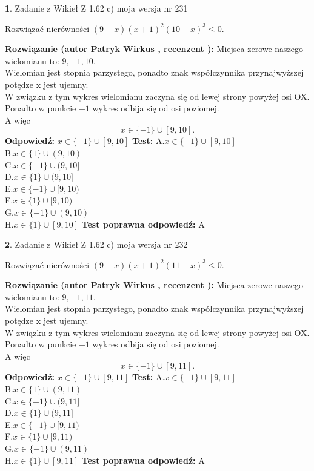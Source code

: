 \documentclass[12pt, a4paper]{article}
\theoremstyle{definition} %
\newtheorem{zad}{}
\newcommand{\zadStart}[1]{\begin{zad}#1\newline}
\newcommand{\zadStop}{\end{zad}}
\newcommand{\rozwStart}[2]{\noindent \textbf{Rozwiązanie (autor #1 , recenzent #2): }\newline}
\newcommand{\rozwStop}{\newline}
\newcommand{\odpStart}{\noindent \textbf{Odpowiedź:}\newline}
\newcommand{\odpStop}{\newline}
\newcommand{\testStart}{\noindent \textbf{Test:}\newline}
\newcommand{\testStop}{\newline}
\newcommand{\kluczStart}{\noindent \textbf{Test poprawna odpowiedź:}\newline}
\newcommand{\kluczStop}{\newline}
\begin{document}
\zadStart{Zadanie z Wikieł Z 1.62 c) moja wersja nr 231}

Rozwiązać nierówności $(9-x)(x+1)^{2}(10-x)^{3}\le0$.
\zadStop
\rozwStart{Patryk Wirkus}{}
Miejsca zerowe naszego wielomianu to: $9, -1, 10$.\\
Wielomian jest stopnia parzystego, ponadto znak współczynnika przy\linebreak najwyższej potędze x jest ujemny.\\ W związku z tym wykres wielomianu zaczyna się od lewej strony powyżej osi OX.\\
Ponadto w punkcie $-1$ wykres odbija się od osi poziomej.\\
A więc $$x \in \{-1\} \cup [9,10].$$
\rozwStop
\odpStart
$x \in \{-1\} \cup [9,10]$
\odpStop
\testStart
A.$x \in \{-1\} \cup [9,10]$\\
B.$x \in \{1\} \cup (9,10)$\\
C.$x \in \{-1\} \cup (9,10]$\\
D.$x \in \{1\} \cup (9,10]$\\
E.$x \in \{-1\} \cup [9,10)$\\
F.$x \in \{1\} \cup [9,10)$\\
G.$x \in \{-1\} \cup (9,10)$\\
H.$x \in \{1\} \cup [9,10]$
\testStop
\kluczStart
A
\kluczStop



\zadStart{Zadanie z Wikieł Z 1.62 c) moja wersja nr 232}

Rozwiązać nierówności $(9-x)(x+1)^{2}(11-x)^{3}\le0$.
\zadStop
\rozwStart{Patryk Wirkus}{}
Miejsca zerowe naszego wielomianu to: $9, -1, 11$.\\
Wielomian jest stopnia parzystego, ponadto znak współczynnika przy\linebreak najwyższej potędze x jest ujemny.\\ W związku z tym wykres wielomianu zaczyna się od lewej strony powyżej osi OX.\\
Ponadto w punkcie $-1$ wykres odbija się od osi poziomej.\\
A więc $$x \in \{-1\} \cup [9,11].$$
\rozwStop
\odpStart
$x \in \{-1\} \cup [9,11]$
\odpStop
\testStart
A.$x \in \{-1\} \cup [9,11]$\\
B.$x \in \{1\} \cup (9,11)$\\
C.$x \in \{-1\} \cup (9,11]$\\
D.$x \in \{1\} \cup (9,11]$\\
E.$x \in \{-1\} \cup [9,11)$\\
F.$x \in \{1\} \cup [9,11)$\\
G.$x \in \{-1\} \cup (9,11)$\\
H.$x \in \{1\} \cup [9,11]$
\testStop
\kluczStart
A
\kluczStop
\end{document}
